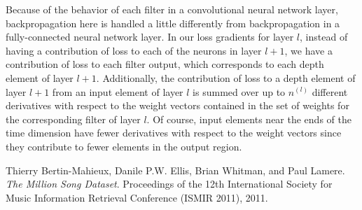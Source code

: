 \documentclass{article} %
\begin{document}
Because of the behavior of each filter in a convolutional neural network layer, backpropagation here is handled a little differently from backpropagation in a fully-connected neural network layer. In our loss gradients for layer $l$, instead of having a contribution of loss to each of the neurons in layer $l+1$, we have a contribution of loss to each filter output, which corresponds to each depth element of layer $l+1$. Additionally, the contribution of loss to a depth element of layer $l+1$ from an input element of layer $l$ is summed over up to $n^{(l)}$ different derivatives with respect to the weight vectors contained in the set of weights for the corresponding filter of layer $l$. Of course, input elements near the ends of the time dimension have fewer derivatives with respect to the weight vectors since they contribute to fewer elements in the output region.

\begin{thebibliography}{10}
Thierry Bertin-Mahieux, Danile P.W. Ellis, Brian Whitman, and Paul Lamere.
\textit{The Million Song Dataset}.
Proceedings of the 12th International Society for Music Information Retrieval Conference (ISMIR 2011), 2011.
\end{thebibliography}
\end{document}
